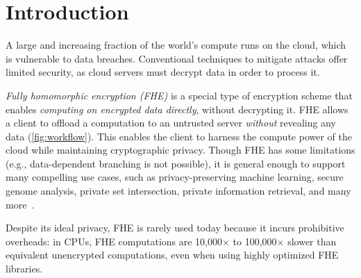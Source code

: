 \chapter{Introduction}\label{sec:intro}

A large and increasing fraction of the world's compute runs on the cloud,
which is vulnerable to data breaches.
Conventional techniques to mitigate attacks offer limited 
security, as cloud servers must decrypt data in order to process it.

\emph{Fully homomorphic encryption (FHE)} is a special type of encryption scheme
that enables \emph{computing on encrypted data directly}, without decrypting it.
FHE allows a client to offload a computation
to an untrusted server \emph{without} revealing any data (\autoref{fig:workflow}).
This enables the client to harness the compute power of the cloud while maintaining cryptographic privacy.
Though FHE has some limitations (e.g., data-dependent branching is not possible), 
it is general enough to support many compelling use cases,
such as privacy-preserving machine learning, secure genome analysis, private set intersection,
private information retrieval, and many more~\cite{kim2020semi,gilad:icml16:cryptonets,han:aaai19:logistic,han:iacr18:efficient,juvekar2018gazelle,DBLP:conf/ccs/ChenLR17,DBLP:conf/tcc/GentryH19}. 

Despite its ideal privacy, FHE is rarely used today because it incurs prohibitive overheads:
in CPUs, FHE computations are 10,000$\times$ to 100,000$\times$
slower than equivalent unencrypted computations, even when using highly optimized FHE libraries.

